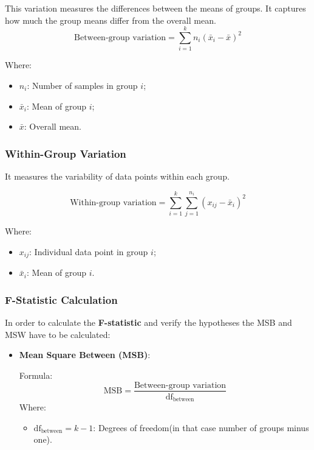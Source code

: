 This variation measures the differences between the means of groups. It
captures how much the group means differ from the overall mean.
\[
\text{Between-group \  variation} = \sum_{i=1}^{k} n_i (\bar{x}_i - \bar{x})^2
\]

\noindent \noindent Where:
\begin{itemize}
    \item \(n_i\): Number of samples in group \(i\);
    \item \(\bar{x}_i\): Mean of group \(i\);
    \item \(\bar{x}\): Overall mean.
\end{itemize}


\subsubsection*{Within-Group Variation}
It measures the variability of data points within each group.

\[
\text{Within-group  \ variation} = \sum_{i=1}^{k} \sum_{j=1}^{n_i} (x_{ij} - \bar{x}_i)^2
\]

\noindent \noindent Where:
\begin{itemize}
    \item \(x_{ij}\): Individual data point in group \(i\);
    \item \(\bar{x}_i\): Mean of group \(i\).
\end{itemize}



\subsubsection*{F-Statistic Calculation}
In order to calculate the \textbf{F-statistic} and verify the hypotheses
the MSB and MSW have to be calculated:

\begin{itemize}
    \item \textbf{Mean Square Between (MSB)}:
    
    Formula:
    \[
    \text{MSB} = \frac{\text{Between-group variation}}{\text{df}_{\text{between}}}
    \]
    \noindent \noindent Where:
    \begin{itemize}
        \item \( \text{df}_{\text{between}} = k - 1 \): Degrees of freedom(in
          that case number of groups minus one).
    \end{itemize}
\end{itemize}

